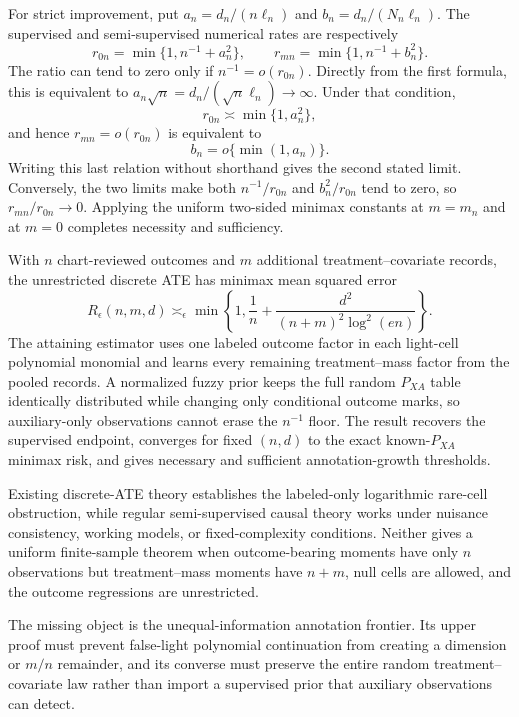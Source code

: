 For strict improvement, put \(a_n=d_n/(n\ell_n)\) and \(b_n=d_n/(N_n\ell_n)\).  The supervised and semi-supervised numerical rates are respectively
\[
 r_{0n}=\min\{1,n^{-1}+a_n^2\},\qquad
 r_{mn}=\min\{1,n^{-1}+b_n^2\}.
\]
The ratio can tend to zero only if \(n^{-1}=o(r_{0n})\).  Directly from the first formula, this is equivalent to \(a_n\sqrt n=d_n/(\sqrt n\ell_n)\to\infty\).  Under that condition,
\[
 r_{0n}\asymp\min\{1,a_n^2\},
\]
and hence \(r_{mn}=o(r_{0n})\) is equivalent to
\[
 b_n=o\{\min(1,a_n)\}.
\]
Writing this last relation without shorthand gives the second stated limit.  Conversely, the two limits make both \(n^{-1}/r_{0n}\) and \(b_n^2/r_{0n}\) tend to zero, so \(r_{mn}/r_{0n}\to0\).  Applying the uniform two-sided minimax constants at \(m=m_n\) and at \(m=0\) completes necessity and sufficiency.

With \(n\) chart-reviewed outcomes and \(m\) additional treatment--covariate records, the unrestricted discrete ATE has minimax mean squared error
\[
 R_\epsilon(n,m,d)\asymp_\epsilon
 \min\!\left\{1,\frac1n+\frac{d^2}{(n+m)^2\log^2(en)}\right\}.
\]
The attaining estimator uses one labeled outcome factor in each light-cell polynomial monomial and learns every remaining treatment--mass factor from the pooled records.  A normalized fuzzy prior keeps the full random \(P_{XA}\) table identically distributed while changing only conditional outcome marks, so auxiliary-only observations cannot erase the \(n^{-1}\) floor.  The result recovers the supervised endpoint, converges for fixed \((n,d)\) to the exact known-\(P_{XA}\) minimax risk, and gives necessary and sufficient annotation-growth thresholds.

Existing discrete-ATE theory establishes the labeled-only logarithmic rare-cell obstruction, while regular semi-supervised causal theory works under nuisance consistency, working models, or fixed-complexity conditions.  Neither gives a uniform finite-sample theorem when outcome-bearing moments have only \(n\) observations but treatment--mass moments have \(n+m\), null cells are allowed, and the outcome regressions are unrestricted.

The missing object is the unequal-information annotation frontier.  Its upper proof must prevent false-light polynomial continuation from creating a dimension or \(m/n\) remainder, and its converse must preserve the entire random treatment--covariate law rather than import a supervised prior that auxiliary observations can detect.

